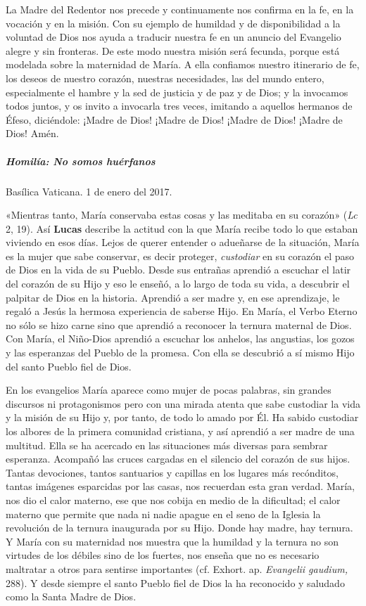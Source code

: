 \documentclass[]{article}
\let\oldsubparagraph\subparagraph
\renewcommand{\subparagraph}[1]{\oldsubparagraph{#1}\mbox{}}
\begin{document}
La Madre del Redentor nos precede y continuamente nos confirma en la fe,
en la vocación y en la misión. Con su ejemplo de humildad y de
disponibilidad a la voluntad de Dios nos ayuda a traducir nuestra fe en
un anuncio del Evangelio alegre y sin fronteras. De este modo nuestra
misión será fecunda, porque está modelada sobre la maternidad de María.
A ella confiamos nuestro itinerario de fe, los deseos de nuestro
corazón, nuestras necesidades, las del mundo entero, especialmente el
hambre y la sed de justicia y de paz y de Dios; y la invocamos todos
juntos, y os invito a invocarla tres veces, imitando a aquellos hermanos
de Éfeso, diciéndole: ¡Madre de Dios! ¡Madre de Dios! ¡Madre de Dios!
¡Madre de Dios! Amén.

\subparagraph{Homilía: No somos
huérfanos}\label{homiluxeda-no-somos-huuxe9rfanos}

Basílica Vaticana. 1 de enero del 2017.

«Mientras tanto, María conservaba estas cosas y las meditaba en su
corazón» (\emph{Lc} 2, 19). Así \textbf{Lucas} describe la actitud con
la que María recibe todo lo que estaban viviendo en esos días. Lejos de
querer entender o adueñarse de la situación, María es la mujer que sabe
conservar, es decir proteger, \emph{custodiar} en su corazón el paso de
Dios en la vida de su Pueblo. Desde sus entrañas aprendió a escuchar el
latir del corazón de su Hijo y eso le enseñó, a lo largo de toda su
vida, a descubrir el palpitar de Dios en la historia. Aprendió a ser
madre y, en ese aprendizaje, le regaló a Jesús la hermosa experiencia de
saberse Hijo. En María, el Verbo Eterno no sólo se hizo carne sino que
aprendió a reconocer la ternura maternal de Dios. Con María, el
Niño-Dios aprendió a escuchar los anhelos, las angustias, los gozos y
las esperanzas del Pueblo de la promesa. Con ella se descubrió a sí
mismo Hijo del santo Pueblo fiel de Dios.

En los evangelios María aparece como mujer de pocas palabras, sin
grandes discursos ni protagonismos pero con una mirada atenta que sabe
custodiar la vida y la misión de su Hijo y, por tanto, de todo lo amado
por Él. Ha sabido custodiar los albores de la primera comunidad
cristiana, y así aprendió a ser madre de una multitud. Ella se ha
acercado en las situaciones más diversas para sembrar esperanza.
Acompañó las cruces cargadas en el silencio del corazón de sus hijos.
Tantas devociones, tantos santuarios y capillas en los lugares más
recónditos, tantas imágenes esparcidas por las casas, nos recuerdan esta
gran verdad. María, nos dio el calor materno, ese que nos cobija en
medio de la dificultad; el calor materno que permite que nada ni nadie
apague en el seno de la Iglesia la revolución de la ternura inaugurada
por su Hijo. Donde hay madre, hay ternura. Y María con su maternidad nos
muestra que la humildad y la ternura no son virtudes de los débiles sino
de los fuertes, nos enseña que no es necesario maltratar a otros para
sentirse importantes (cf. Exhort. ap. \emph{Evangelii gaudium,} 288). Y
desde siempre el santo Pueblo fiel de Dios la ha reconocido y saludado
como la Santa Madre de Dios.
\end{document}
